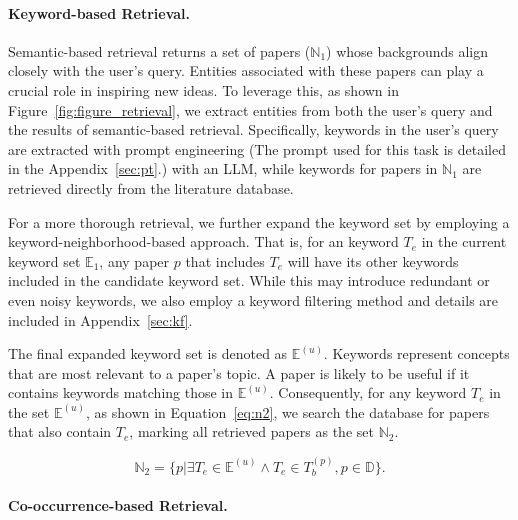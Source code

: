 \documentclass{article}
\theoremstyle{plain}
\theoremstyle{definition}
\theoremstyle{remark}
\begin{document}
\paragraph{Keyword-based Retrieval.}
Semantic-based retrieval returns a set of papers ($\mathbb{N}_1$) whose backgrounds align closely with the user's query. Entities associated with these papers can play a crucial role in inspiring new ideas. To leverage this, as shown in Figure~\ref{fig:figure_retrieval}, we extract entities from both the user's query and the results of semantic-based retrieval. Specifically, keywords in the user's query are extracted with prompt engineering (The prompt used for this task is detailed in the Appendix~\ref{sec:pt}.) with an LLM, while keywords for papers in $\mathbb{N}_1$ are retrieved directly from the literature database.

For a more thorough retrieval, we further expand the keyword set by employing a keyword-neighborhood-based approach. That is, for an keyword $T_e$ in the current keyword set $\mathbb{E}_1$, any paper $p$ that includes $T_e$ will have its other keywords included in the candidate keyword set. While this may introduce redundant or even noisy keywords, we also employ a keyword filtering method and details are included in Appendix~\ref{sec:kf}.

The final expanded keyword set is denoted as $\mathbb{E}^{(u)}$. Keywords represent concepts that are most relevant to a paper's topic. A paper is likely to be useful if it contains keywords matching those in $\mathbb{E}^{(u)}$. Consequently, for any keyword $T_e$ in the set $\mathbb{E}^{(u)}$, as shown in Equation~\eqref{eq:n2}, we search the database for papers that also contain $T_e$, marking all retrieved papers as the set $\mathbb{N}_2$.

\begin{equation} \label{eq:n2}
    \mathbb{N}_2 = \{p | \exists T_e \in \mathbb{E}^{(u)} \wedge T_e \in T^{(p)}_b, p \in \mathbb{D}\}.
\end{equation}

\paragraph{Co-occurrence-based Retrieval.} 
\end{document}
